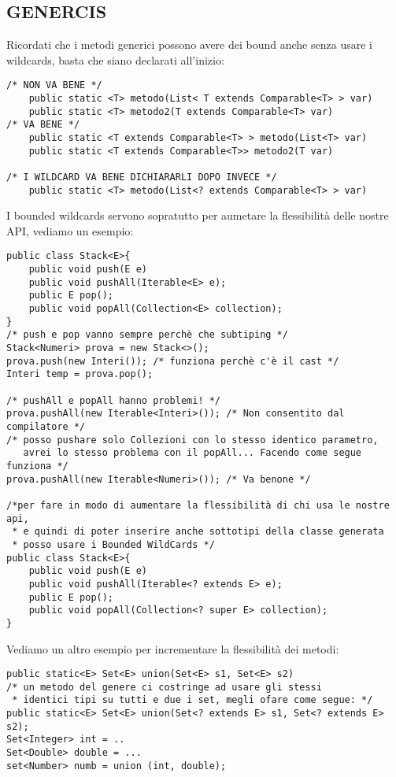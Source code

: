 \subsection{GENERCIS}
\noindent Ricordati che i metodi generici possono avere dei bound anche senza usare i wildcards, basta che siano declarati all'inizio:
\begin{lstlisting}
/* NON VA BENE */
	public static <T> metodo(List< T extends Comparable<T> > var)
	public static <T> metodo2(T extends Comparable<T> var)
/* VA BENE */
	public static <T extends Comparable<T> > metodo(List<T> var)
	public static <T extends Comparable<T>> metodo2(T var)	
	
/* I WILDCARD VA BENE DICHIARARLI DOPO INVECE */
	public static <T> metodo(List<? extends Comparable<T> > var)
\end{lstlisting}
\noindent I bounded wildcards servono sopratutto per aumetare la flessibilità delle nostre API, vediamo un esempio:
\begin{lstlisting}
public class Stack<E>{
	public void push(E e)
	public void pushAll(Iterable<E> e);
	public E pop();
	public void popAll(Collection<E> collection);
}
/* push e pop vanno sempre perchè che subtiping */
Stack<Numeri> prova = new Stack<>();
prova.push(new Interi()); /* funziona perchè c'è il cast */
Interi temp = prova.pop();

/* pushAll e popAll hanno problemi! */
prova.pushAll(new Iterable<Interi>()); /* Non consentito dal compilatore */
/* posso pushare solo Collezioni con lo stesso identico parametro,
   avrei lo stesso problema con il popAll... Facendo come segue funziona */
prova.pushAll(new Iterable<Numeri>()); /* Va benone */ 

/*per fare in modo di aumentare la flessibilità di chi usa le nostre api,
 * e quindi di poter inserire anche sottotipi della classe generata 
 * posso usare i Bounded WildCards */
public class Stack<E>{
	public void push(E e)
	public void pushAll(Iterable<? extends E> e);
	public E pop();
	public void popAll(Collection<? super E> collection);
}

\end{lstlisting}
\noindent Vediamo un altro esempio per incrementare la flessibilità dei metodi:
\begin{lstlisting}
public static<E> Set<E> union(Set<E> s1, Set<E> s2)
/* un metodo del genere ci costringe ad usare gli stessi
 * identici tipi su tutti e due i set, megli ofare come segue: */
public static<E> Set<E> union(Set<? extends E> s1, Set<? extends E> s2);
Set<Integer> int = ..
Set<Double> double = ...
set<Number> numb = union (int, double);
\end{lstlisting}
